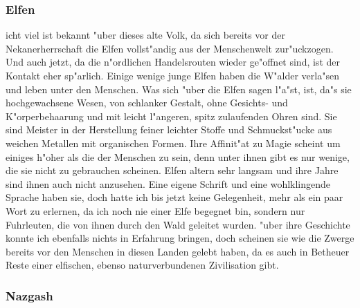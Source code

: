 \documentclass[a5paper,8pt]{book}
\begin{document}
\newpage

\subsubsection{ Elfen}

icht viel ist bekannt "uber dieses alte Volk, da sich bereits vor der Nekanerherrschaft die Elfen vollst"andig aus der Menschenwelt zur"uckzogen. Und auch jetzt, da die n"ordlichen Handelsrouten wieder ge"offnet sind, ist der Kontakt eher sp"arlich. Einige wenige junge Elfen haben die W"alder verla"sen und leben unter den Menschen. Was sich "uber die Elfen sagen l"a"st, ist, da"s sie  hochgewachsene Wesen, von schlanker Gestalt, ohne Gesichts- und K"orperbehaarung und mit leicht l"angeren, spitz zulaufenden Ohren sind. Sie sind Meister in der Herstellung feiner leichter Stoffe und Schmuckst"ucke aus weichen Metallen mit organischen Formen.  Ihre Affinit"at zu Magie scheint um einiges h"oher als die der Menschen zu sein, denn unter ihnen gibt es nur wenige, die sie nicht zu gebrauchen scheinen. Elfen altern sehr langsam und ihre Jahre sind ihnen auch nicht anzusehen. Eine eigene Schrift und eine wohlklingende Sprache haben sie, doch hatte ich bis jetzt keine Gelegenheit, mehr als ein paar Wort zu 
erlernen, da ich noch nie einer Elfe begegnet bin, sondern nur Fuhrleuten, die von ihnen durch den Wald geleitet wurden. "uber ihre Geschichte konnte ich ebenfalls nichts in Erfahrung bringen, doch scheinen sie wie die Zwerge bereits vor den Menschen in diesen Landen gelebt haben, da es auch in Betheuer Reste einer elfischen, ebenso naturverbundenen Zivilisation gibt. 

\newpage

\subsubsection{ Nazgash}
\end{document}

